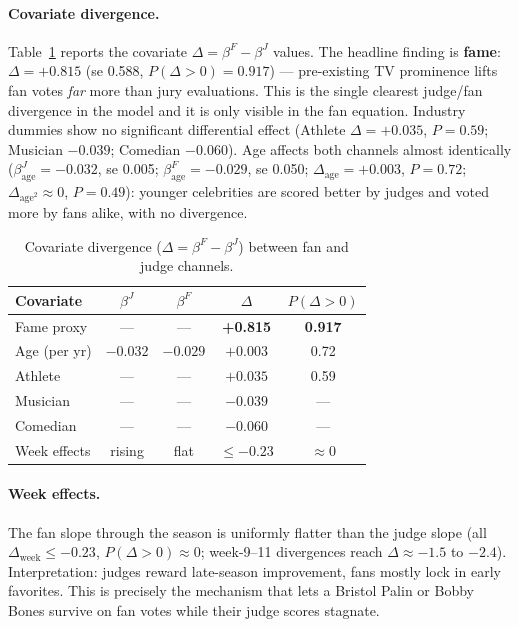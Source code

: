 \documentclass[11pt]{article}
\begin{document}
\paragraph{Covariate divergence.} Table~\ref{tab:divergence} reports
the covariate $\Delta = \beta^F - \beta^J$ values. The headline finding
is \textbf{fame}: $\Delta = +0.815$ (se 0.588, $P(\Delta>0) = 0.917$)
--- pre-existing TV prominence lifts fan votes \emph{far} more than jury
evaluations. This is the single clearest judge/fan divergence in the
model and it is only visible in the fan equation. Industry dummies show
no significant differential effect (Athlete $\Delta = +0.035$,
$P = 0.59$; Musician $-0.039$; Comedian $-0.060$). Age affects both
channels almost identically ($\beta^J_{\text{age}} = -0.032$, se 0.005;
$\beta^F_{\text{age}} = -0.029$, se 0.050; $\Delta_{\text{age}} =
+0.003$, $P = 0.72$; $\Delta_{\text{age}^2} \approx 0$, $P = 0.49$):
younger celebrities are scored better by judges and voted more by fans
alike, with no divergence.

\begin{table}[H]
\centering
\caption{Covariate divergence ($\Delta = \beta^F - \beta^J$) between
fan and judge channels.}
\label{tab:divergence}
\begin{tabular}{lcccc}
\toprule
Covariate & $\beta^J$ & $\beta^F$ & $\Delta$ & $P(\Delta > 0)$ \\
\midrule
Fame proxy & --- & --- & \textbf{+0.815} & \textbf{0.917} \\
Age (per yr) & $-0.032$ & $-0.029$ & $+0.003$ & 0.72 \\
Athlete & --- & --- & $+0.035$ & 0.59 \\
Musician & --- & --- & $-0.039$ & --- \\
Comedian & --- & --- & $-0.060$ & --- \\
Week effects & rising & flat & $\le -0.23$ & $\approx 0$ \\
\bottomrule
\end{tabular}
\end{table}

\paragraph{Week effects.} The fan slope through the season is uniformly
flatter than the judge slope (all $\Delta_{\text{week}} \le -0.23$,
$P(\Delta>0) \approx 0$; week-9--11 divergences reach $\Delta \approx
-1.5$ to $-2.4$). Interpretation: judges reward late-season improvement,
fans mostly lock in early favorites. This is precisely the mechanism
that lets a Bristol Palin or Bobby Bones survive on fan votes while
their judge scores stagnate.
\end{document}
